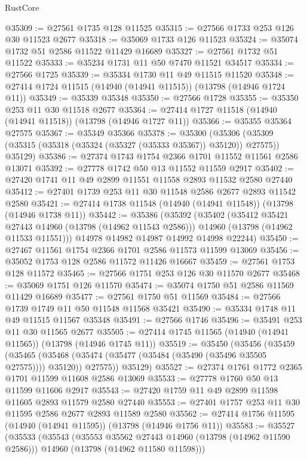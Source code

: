 \begin{lexlean}{RustCore}
\begin{coremodule}
@35309 := @27561 @1735 @128 @11525
@35315 := @27566 @1733 @253 @126 @30 @11523 @2677
@35318 := @35069 @1733 @126 @11523
@35324 := @35074 @1732 @51 @2586 @11522 @11429 @16689
@35327 := @27561 @1732 @51 @11522
@35333 := @35234 @1731 @11 @50 @7470 @11521 @34517
@35334 := @27566 @1725
@35339 := @35334 @1730 @11 @49 @11515 @11520
@35348 := @27414 @1724 @11515 (@14940 (@14941 @11515)) (@13798 (@14946 @1724 @11))
@35349 := @35339 @35348
@35350 := @27566 @1728
@35355 := @35350 @253 @11 @30 @11518 @2677
@35364 := @27414 @1727 @11518 (@14940 (@14941 @11518)) (@13798 (@14946 @1727 @11))
@35366 := @35355 @35364 @27575
@35367 := @35349 @35366
@35378 := @35300
    (@35306 (@35309 (@35315 (@35318 (@35324 (@35327 (@35333 @35367)) @35120)) @27575)) @35129)
@35386 := @27374 @1743 @1754 @2366 @1701 @11552 @11561 @2586 @13071
@35392 := @27778 @1742 @50 @13 @11552 @11559 @2917
@35402 := @27420 @1741 @11 @49 @2899 @11551 @11558 @2893 @11532 @2580 @27440
@35412 := @27401 @1739 @253 @11 @30 @11548 @2586 @2677 @2893 @11542 @2580
@35421 := @27414 @1738 @11548 (@14940 (@14941 @11548)) (@13798 (@14946 @1738 @11))
@35442 := @35386
    (@35392
      (@35402
        (@35412 @35421 @27443 @14960 (@13798 (@14962 @11543 @2586)))
        @14960
        (@13798 (@14962 @11533 @11551)))
      @14978
      @14982
      @14987
      @14992
      @14998
      @22244)
@35450 := @27467 @11561 @1754 @2366 @1701 @2586 @11573 @11599 @13069
@35456 := @35052 @1753 @128 @2586 @11572 @11426 @16667
@35459 := @27561 @1753 @128 @11572
@35465 := @27566 @1751 @253 @126 @30 @11570 @2677
@35468 := @35069 @1751 @126 @11570
@35474 := @35074 @1750 @51 @2586 @11569 @11429 @16689
@35477 := @27561 @1750 @51 @11569
@35484 := @27566 @1739 @1749 @11 @50 @11548 @11568 @35421
@35490 := @35334 @1748 @11 @49 @11515 @11567 @35348
@35491 := @27566 @1746
@35496 := @35491 @253 @11 @30 @11565 @2677
@35505 := @27414 @1745 @11565 (@14940 (@14941 @11565)) (@13798 (@14946 @1745 @11))
@35519 := @35450
    (@35456
      (@35459
        (@35465 (@35468 (@35474 (@35477 (@35484 (@35490 (@35496 @35505 @27575)))) @35120)) @27575))
      @35129)
@35527 := @27374 @1761 @1772 @2365 @1701 @11599 @11608 @2586 @13069
@35533 := @27778 @1760 @50 @13 @11599 @11606 @2917
@35543 := @27420 @1759 @11 @49 @2899 @11598 @11605 @2893 @11579 @2580 @27440
@35553 := @27401 @1757 @253 @11 @30 @11595 @2586 @2677 @2893 @11589 @2580
@35562 := @27414 @1756 @11595 (@14940 (@14941 @11595)) (@13798 (@14946 @1756 @11))
@35583 := @35527
    (@35533
      (@35543
        (@35553 @35562 @27443 @14960 (@13798 (@14962 @11590 @2586)))
        @14960
        (@13798 (@14962 @11580 @11598)))

\end{coremodule}
\end{lexlean}
